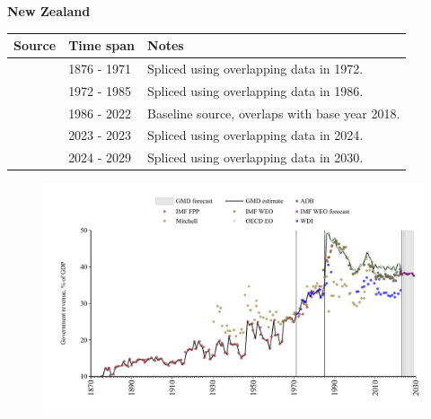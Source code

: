 \documentclass[12pt,a4paper,landscape]{article}
\begin{document}
\begin{adjustbox}{max totalsize={\paperwidth}{\paperheight},center}
\begin{minipage}[t][\textheight][t]{\textwidth}
\vspace*{0.5cm}
{}
\begin{center}
{\Large\bfseries New Zealand}
\end{center}
\vspace{0.5cm}
\begin{table}[H]
\centering
\small
\begin{tabular}{|l|l|l|}
\hline
\textbf{Source} & \textbf{Time span} & \textbf{Notes} \\
\hline
\rowcolor{white}\cite{IMF_FPP}& 1876 - 1971 &Spliced using overlapping data in 1972.\\
\rowcolor{lightgray}\cite{WDI}& 1972 - 1985 &Spliced using overlapping data in 1986.\\
\rowcolor{white}\cite{OECD_EO}& 1986 - 2022 &Baseline source, overlaps with base year 2018.\\
\rowcolor{lightgray}\cite{IMF_FPP}& 2023 - 2023 &Spliced using overlapping data in 2024.\\
\rowcolor{white}\cite{IMF_WEO_forecast}& 2024 - 2029 &Spliced using overlapping data in 2030.\\
\hline
\end{tabular}
\end{table}
\begin{figure}[H]
\centering
\includegraphics[width=\textwidth,height=0.6\textheight,keepaspectratio]{graphs/NZL_govrev_GDP.pdf}
\end{figure}
\end{minipage}
\end{adjustbox}
\end{document}
